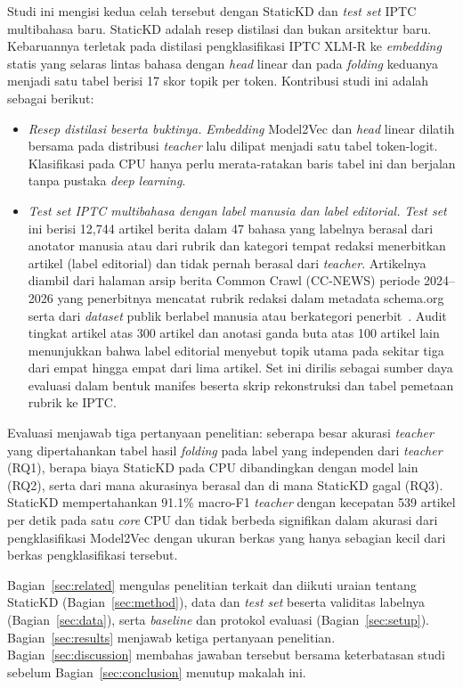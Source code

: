 \documentclass{ieeeaccess}
\newcommand{\en}[1]{\textit{#1}}
\begin{document}
Studi ini mengisi kedua celah tersebut dengan StaticKD dan \en{test set} IPTC multibahasa baru. StaticKD adalah resep distilasi dan bukan arsitektur baru. Kebaruannya terletak pada distilasi pengklasifikasi IPTC XLM-R ke \en{embedding} statis yang selaras lintas bahasa dengan \en{head} linear dan pada \en{folding} keduanya menjadi satu tabel berisi 17 skor topik per token. Kontribusi studi ini adalah sebagai berikut:
\begin{itemize}
  \item \emph{Resep distilasi beserta buktinya.} \en{Embedding} Model2Vec dan \en{head} linear dilatih bersama pada distribusi \en{teacher} lalu dilipat menjadi satu tabel token-logit. Klasifikasi pada CPU hanya perlu merata-ratakan baris tabel ini dan berjalan tanpa pustaka \en{deep learning}.
  \item \emph{\en{Test set} IPTC multibahasa dengan label manusia dan label editorial.} \en{Test set} ini berisi 12,744 artikel berita dalam 47 bahasa yang labelnya berasal dari anotator manusia atau dari rubrik dan kategori tempat redaksi menerbitkan artikel (label editorial) dan tidak pernah berasal dari \en{teacher}. Artikelnya diambil dari halaman arsip berita Common Crawl (CC-NEWS) periode 2024--2026 yang penerbitnya mencatat rubrik redaksi dalam metadata schema.org~\cite{guha2016schema} serta dari \en{dataset} publik berlabel manusia atau berkategori penerbit~\cite{adelani2023masakhanews,petukhova2023mnds,mirashi2023indicnews,hossain2025banglanews,indonews2021}. Audit tingkat artikel atas 300 artikel dan anotasi ganda buta atas 100 artikel lain menunjukkan bahwa label editorial menyebut topik utama pada sekitar tiga dari empat hingga empat dari lima artikel. Set ini dirilis sebagai sumber daya evaluasi dalam bentuk manifes beserta skrip rekonstruksi dan tabel pemetaan rubrik ke IPTC.
\end{itemize}

Evaluasi menjawab tiga pertanyaan penelitian: seberapa besar akurasi \en{teacher} yang dipertahankan tabel hasil \en{folding} pada label yang independen dari \en{teacher} (RQ1), berapa biaya StaticKD pada CPU dibandingkan dengan model lain (RQ2), serta dari mana akurasinya berasal dan di mana StaticKD gagal (RQ3). StaticKD mempertahankan 91.1\% macro-F1 \en{teacher} dengan kecepatan 539 artikel per detik pada satu \en{core} CPU dan tidak berbeda signifikan dalam akurasi dari pengklasifikasi Model2Vec dengan ukuran berkas yang hanya sebagian kecil dari berkas pengklasifikasi tersebut.

Bagian~\ref{sec:related} mengulas penelitian terkait dan diikuti uraian tentang StaticKD (Bagian~\ref{sec:method}), data dan \en{test set} beserta validitas labelnya (Bagian~\ref{sec:data}), serta \en{baseline} dan protokol evaluasi (Bagian~\ref{sec:setup}). Bagian~\ref{sec:results} menjawab ketiga pertanyaan penelitian. Bagian~\ref{sec:discussion} membahas jawaban tersebut bersama keterbatasan studi sebelum Bagian~\ref{sec:conclusion} menutup makalah ini.
\end{document}
